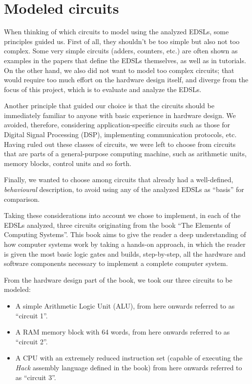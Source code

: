 \section{Modeled circuits}
\label{sec:circuits}

    When thinking of which circuits to model using the analyzed EDSLs, some principles guided us.
    First of all, they shouldn't be too simple but also not too complex. Some very simple circuits
    (adders, counters, etc.) are often shown as examples in the papers that define the EDSLs
    themselves, as well as in tutorials. On the other hand, we also did not want to model too
    complex circuits; that would require too much effort on the hardware design itself, and diverge
    from the focus of this project, which is to evaluate and analyze the EDSLs.

    Another principle that guided our choice is that the circuits should be immediately familiar to
    anyone with basic experience in hardware design. We avoided, therefore, considering
    application-specific circuits such as those for Digital Signal Processing (DSP), implementing
    communication protocols, etc. Having ruled out these classes of circuits, we were left to choose
    from circuits that are parts of a general-purpose computing machine, such as arithmetic units,
    memory blocks, control units and so forth.

    Finally, we wanted to choose among circuits that already had a well-defined, \emph{behavioural}
    description, to avoid using any of the analyzed EDSLs as ``basis'' for comparison.

    Taking these considerations into account we chose to implement, in each of the EDSLs analyzed,
    three circuits originating from the book ``The Elements of Computing
    Systems''\cite{nand2tetris-book}. This book aims to give the reader a deep understanding of how
    computer systems work by taking a hands-on approach, in which the reader is given the most basic
    logic gates and builds, step-by-step, all the hardware and software components necessary to
    implement a complete computer system.

    From the hardware design part of the book, we took our three circuits to be modeled:

    \begin{itemize}
        \item A simple Arithmetic Logic Unit (ALU), from here onwards referred to as ``circuit 1''.

        \item A RAM memory block with 64 words, from here onwards referred to as ``circuit 2''.

        \item A CPU with an extremely reduced instruction set (capable of executing the \emph{Hack}
            assembly language defined in the book) from here onwards referred to as ``circuit 3''.
    \end{itemize}

